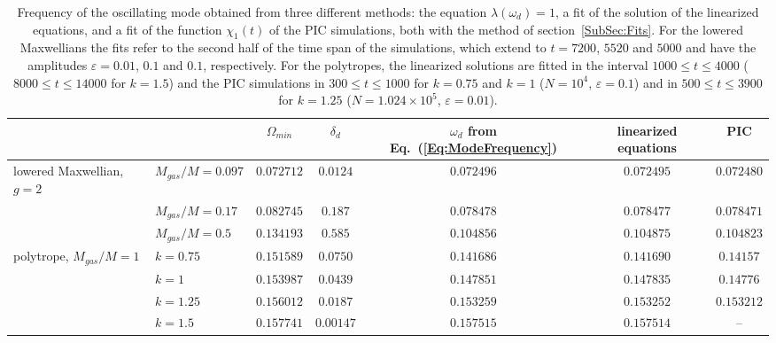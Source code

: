 \begin{table}[htp]
\begin{center}
\begin{tabular}{ll|c|c|ccc}
\hline\hline
 & & $\Omega_{min}$ & $\delta_d$ & $\omega_d$ from Eq.~(\ref{Eq:ModeFrequency}) & linearized equations & PIC \\
\hline
lowered Maxwellian, $g = 2$ & $M_{gas}/M = 0.097$ & $0.072712$ & $0.0124$ & $0.072496$ & $0.072495$ & $0.072480$ \\
 & $M_{gas}/M = 0.17$ & $0.082745$ & $0.187$ & $0.078478$ & $0.078477$ & $0.078471$ \\
 & $M_{gas}/M = 0.5$ & $0.134193$ & $0.585$ & $0.104856$ & $0.104875$ & $0.104823$ \\
\hline
polytrope, $M_{gas}/M = 1$ & $k = 0.75$ & $0.151589$ & $0.0750$ & $0.141686$ & $0.141690$ & $0.14157$ \\
 & $k = 1$ & $0.153987$ & $0.0439$ & $0.147851$ & $0.147835$ & $0.14776$ \\
 & $k = 1.25$ & $0.156012$ & $0.0187$ & $0.153259$ & $0.153252$ & $0.153212$ \\
 & $k = 1.5$ & $0.157741$ & $0.00147$ & $0.157515$ & $0.157514$ & -- \\
\hline\hline
\end{tabular}
\end{center}
\caption{Frequency of the oscillating mode obtained from three different methods: the equation $\lambda(\omega_d) = 1$, a fit of the solution of the linearized equations, and a fit of the function $\chi_1(t)$ of the PIC simulations, both with the method of section~\ref{SubSec:Fits}. For the lowered Maxwellians the fits refer to the second half of the time span of the simulations, which extend to $t = 7200$, $5520$ and $5000$ and have the amplitudes $\varepsilon = 0.01$, $0.1$ and $0.1$, respectively. For the polytropes, the linearized solutions are fitted in the interval $1000\leq t\leq 4000$ ($8000\leq t\leq 14000$ for $k = 1.5$) and the PIC simulations in $300\leq t\leq 1000$ for $k = 0.75$ and $k = 1$ ($N = 10^4$, $\varepsilon = 0.1$) and in $500\leq t\leq 3900$ for $k = 1.25$ ($N = 1.024\times 10^5$, $\varepsilon = 0.01$).}
\label{Tab:Modes}
\end{table}

